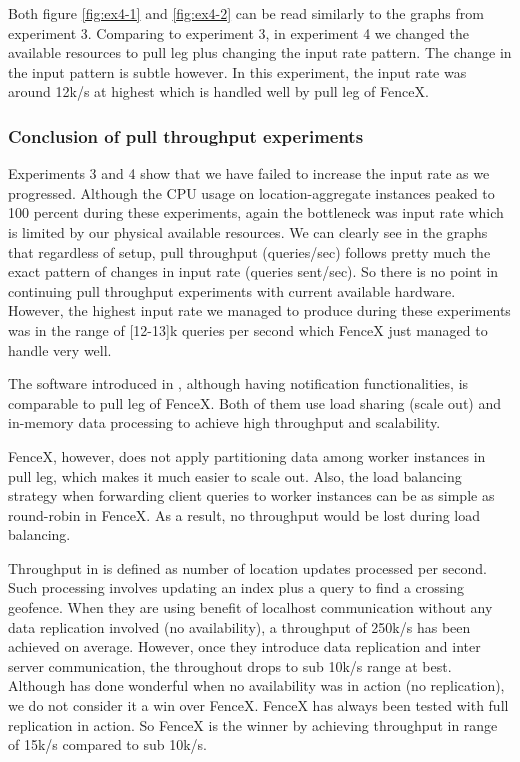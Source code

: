 \documentclass[a4]{report}
\begin{document}
    \clearpage

    Both figure \ref{fig:ex4-1} and \ref{fig:ex4-2} can be read similarly to the graphs from experiment 3.
    Comparing to experiment 3, in experiment 4 we changed the available resources to pull leg plus changing the input
    rate pattern.
    The change in the input pattern is subtle however.
    In this experiment, the input rate was around 12k/s at highest which is handled well by pull leg of FenceX.

    \subsubsection{Conclusion of pull throughput experiments}
    Experiments 3 and 4 show that we have failed to increase the input rate as we progressed.
    Although the CPU usage on location-aggregate instances peaked to 100 percent during these experiments,
    again the bottleneck was input rate which is limited by our physical available resources.
    We can clearly see in the graphs that regardless of setup, pull throughput (queries/sec) follows pretty
    much the exact pattern of changes in input rate (queries sent/sec).
    So there is no point in continuing pull throughput experiments with current available hardware.
    However, the highest input rate we managed to produce during these experiments was in the range of [12-13]k queries
    per second which FenceX just managed to handle very well.

    The software introduced in \cite{Cirillo-Jacobs-Martin-Szczytowski-2014}, although having notification
    functionalities, is comparable to pull leg of FenceX.
    Both of them use load sharing (scale out) and in-memory data processing to achieve high throughput and
    scalability.

    FenceX, however, does not apply partitioning data among worker instances in pull leg, which makes it much easier to
    scale out.
    Also, the load balancing strategy when forwarding client queries to worker instances can be as simple as
    round-robin in FenceX.
    As a result, no throughput would be lost during load balancing.

    Throughput in \cite{Cirillo-Jacobs-Martin-Szczytowski-2014} is defined as number of location updates processed per second.
    Such processing involves updating an index plus a query to find a crossing geofence.
    When they are using benefit of localhost communication without any data replication involved (no availability), a
    throughput of 250k/s has been achieved on average.
    However, once they introduce data replication and inter server communication, the throughout drops to sub 10k/s
    range at best.
    Although \cite{Cirillo-Jacobs-Martin-Szczytowski-2014} has done wonderful when no availability was in action (no
    replication), we do not consider it a win over FenceX.
    FenceX has always been tested with full replication in action.
    So FenceX is the winner by achieving throughput in range of 15k/s compared to sub 10k/s.
\end{document}
